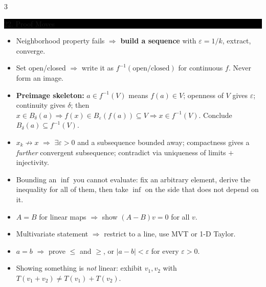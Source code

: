 \documentclass[8pt,letterpaper]{article}
\makeatletter
\newcommand{\sect}[1]{%
  \vspace{2.2pt}%
  \noindent\colorbox{black}{\parbox{\dimexpr\linewidth-2\fboxsep}{%
    \color{white}\bfseries\scshape\fontsize{6.4}{7.4}\selectfont
    \hyphenpenalty=10000\exhyphenpenalty=10000\raggedright #1}}%
  \vspace{1.4pt}\par\nopagebreak\@afterheading}
\newenvironment{tl}
  {\begin{itemize}[leftmargin=6pt,itemsep=0.3pt,topsep=1pt,parsep=0pt,
                   partopsep=0pt,label=\textcolor{gray}{\tiny$\bullet$}]}
  {\end{itemize}}
\makeatother
\begin{document}
\begin{multicols}{3}
\sect{22. Proof Moves}
\begin{tl}
\item Neighborhood property fails $\Rightarrow$ \textbf{build a sequence} with $\varepsilon=1/k$, extract, converge.
\item Set open/closed $\Rightarrow$ write it as $f^{-1}(\text{open/closed})$ for continuous $f$. Never form an image.
\item \textbf{Preimage skeleton:} $a\in f^{-1}(V)$ means $f(a)\in V$; openness of $V$ gives $\varepsilon$; continuity gives $\delta$; then $x\in B_\delta(a)\Rightarrow f(x)\in B_\varepsilon(f(a))\subseteq V\Rightarrow x\in f^{-1}(V)$. Conclude $B_\delta(a)\subseteq f^{-1}(V)$.
\item $x_k\not\to x$ $\Rightarrow$ $\exists\varepsilon>0$ and a subsequence bounded away; compactness gives a \emph{further} convergent subsequence; contradict via uniqueness of limits $+$ injectivity.
\item Bounding an $\inf$ you cannot evaluate: fix an arbitrary element, derive the inequality for all of them, then take $\inf$ on the side that does not depend on it.
\item $A=B$ for linear maps $\Rightarrow$ show $(A-B)v=0$ for all $v$.
\item Multivariate statement $\Rightarrow$ restrict to a line, use MVT or 1-D Taylor.
\item $a=b$ $\Rightarrow$ prove $\le$ and $\ge$, or $|a-b|<\varepsilon$ for every $\varepsilon>0$.
\item Showing something is \emph{not} linear: exhibit $v_1,v_2$ with $T(v_1+v_2)\ne T(v_1)+T(v_2)$.
\end{tl}

\end{multicols}
\end{document}
